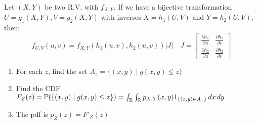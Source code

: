 \begin{ctheorem*}
  Let \((X, Y)\) be two R.V. with \(f_{X, Y}\). If we have a bijective transformation \(U = g_1(X, Y), V = g_2(X, Y)\) with inverses \(X = h_1(U, V)\) and \(Y = h_2(U, V)\), then:
  \[f_{U, V}(u, v) = f_{X, Y}(h_1(u, v), h_2(u, v))|J| \quad J = \begin{bmatrix}
    \frac{\partial h_1}{\partial u} & \frac{\partial h_1}{\partial v} \\
    \frac{\partial h_2}{\partial u} & \frac{\partial h_2}{\partial v}
  \end{bmatrix}
  \]
\end{ctheorem*}

\begin{theorem*}[CDF/PDF of \(Z = g(X, Y)\)]
  \begin{enumerate}
    \item For each \(z\), find the set \(A_z = \{(x, y) \mid g(x, y) \leq z\}\)
    \item Find the CDF \(F_Z(z) = \mathbb{P}(\{(x, y) \mid g(x, y) \leq z\}) = \int_{\mathbb{R}} \int_{\mathbb{R}} p_{X, Y}(x, y) 1_{\{(x, y) \in A_z\}} \, dx \, dy\)
    \item The pdf is \(p_Z(z) = F'_Z(z)\)
  \end{enumerate}
\end{theorem*}
